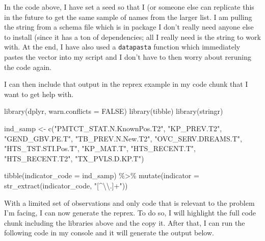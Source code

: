 \documentclass[
  letterpaper,
  DIV=11,
  numbers=noendperiod]{scrreprt}
\newenvironment{Shaded}{\begin{snugshade}}{\end{snugshade}}
\newcommand{\AttributeTok}[1]{\textcolor[rgb]{0.40,0.45,0.13}{#1}}
\newcommand{\ConstantTok}[1]{\textcolor[rgb]{0.56,0.35,0.01}{#1}}
\newcommand{\FunctionTok}[1]{\textcolor[rgb]{0.28,0.35,0.67}{#1}}
\newcommand{\NormalTok}[1]{\textcolor[rgb]{0.00,0.23,0.31}{#1}}
\newcommand{\OtherTok}[1]{\textcolor[rgb]{0.00,0.23,0.31}{#1}}
\newcommand{\SpecialCharTok}[1]{\textcolor[rgb]{0.37,0.37,0.37}{#1}}
\newcommand{\StringTok}[1]{\textcolor[rgb]{0.13,0.47,0.30}{#1}}
\begin{document}
In the code above, I have set a seed so that I (or someone else can
replicate this in the future to get the same sample of names from the
larger list. I am pulling the string from a schema file which is in
package I don't really need anyone else to install (since it has a ton
of dependencies; all I really need is the string to work with. At the
end, I have also used a \texttt{datapasta} function which immediately
pastes the vector into my script and I don't have to then worry about
reruning the code again.

I can then include that output in the reprex example in my code chunk
that I want to get help with.

\begin{Shaded}
\begin{Highlighting}[]
\FunctionTok{library}\NormalTok{(dplyr, }\AttributeTok{warn.conflicts =} \ConstantTok{FALSE}\NormalTok{)}
\FunctionTok{library}\NormalTok{(tibble)}
\FunctionTok{library}\NormalTok{(stringr)}
 
\NormalTok{ind\_samp }\OtherTok{\textless{}{-}} \FunctionTok{c}\NormalTok{(}\StringTok{"PMTCT\_STAT.N.KnownPos.T2"}\NormalTok{, }\StringTok{"KP\_PREV.T2"}\NormalTok{, }\StringTok{"GEND\_GBV.PE.T"}\NormalTok{, }\StringTok{"TB\_PREV.N.New.T2"}\NormalTok{, }\StringTok{"OVC\_SERV.DREAMS.T"}\NormalTok{, }\StringTok{"HTS\_TST.STI.Pos.T"}\NormalTok{, }\StringTok{"KP\_MAT.T"}\NormalTok{, }\StringTok{"HTS\_RECENT.T"}\NormalTok{, }\StringTok{"HTS\_RECENT.T2"}\NormalTok{, }\StringTok{"TX\_PVLS.D.KP.T"}\NormalTok{)}

\FunctionTok{tibble}\NormalTok{(}\AttributeTok{indicator\_code =}\NormalTok{ ind\_samp) }\SpecialCharTok{\%\textgreater{}\%} 
  \FunctionTok{mutate}\NormalTok{(}\AttributeTok{indicator =} \FunctionTok{str\_extract}\NormalTok{(indicator\_code, }\StringTok{"[\^{}}\SpecialCharTok{\textbackslash{}\textbackslash{}}\StringTok{.]+"}\NormalTok{))}
\end{Highlighting}
\end{Shaded}

With a limited set of observations and only code that is relevant to the
problem I'm facing, I can now generate the reprex. To do so, I will
highlight the full code chunk including the libraries above and the copy
it. After that, I can run the following code in my console and it will
generate the output below.
\end{document}
